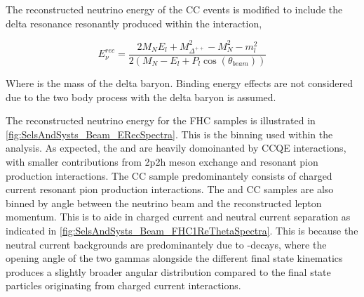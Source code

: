 The reconstructed neutrino energy of the CC\quickmath{1\pi^{+}} events is modified to include the delta resonance resonantly produced within the interaction,

\begin{equation}
  \label{sec:SelsAndSysts_Erec_CCRES}
  E^{rec}_{\nu} = \frac{2M_{N}E_{l} + M_{\Delta^{++}}^{2} - M_{N}^{2} - m_{l}^{2}}{2(M_{N} - E_{l} + P_{l}\cos(\theta_{beam}))}
\end{equation}

Where  is the mass of the delta baryon. Binding energy effects are not considered due to the two body process with the delta baryon is assumed.

The reconstructed neutrino energy for the FHC samples is illustrated in \autoref{fig:SelsAndSysts_Beam_ERecSpectra}. This is the binning used within the analysis. As expected, the  and  are heavily domoinanted by CCQE interactions, with smaller contributions from 2p2h meson exchange and resonant pion production interactions. The CC\quickmath{1\pi^{+}} sample predominantely consists of charged current resonant pion production interactions. The  and CC\quickmath{1\pi^{+}} samples are also binned by angle between the neutrino beam and the reconstructed lepton momentum. This is to aide in charged current and neutral current separation as indicated in \autoref{fig:SelsAndSysts_Beam_FHC1ReThetaSpectra}. This is because the neutral current backgrounds are predominantely due to -decays, where the opening angle of the two gammas alongside the different final state kinematics produces a slightly broader angular distribution compared to the final state particles originating from charged current  interactions.

